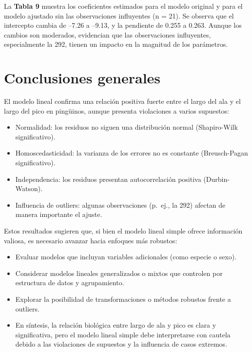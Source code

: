\documentclass[
  spanish,
  11pt,
  a4paper,
  DIV=11,
  numbers=noendperiod]{scrartcl}
\begin{document}
La \textbf{Tabla 9} muestra los coeficientes estimados para el modelo
original y para el modelo ajustado sin las observaciones influyentes (n
= 21). Se observa que el intercepto cambia de --7.26 a --9.13, y la
pendiente de 0.255 a 0.263. Aunque los cambios son moderados, evidencian
que las observaciones influyentes, especialmente la 292, tienen un
impacto en la magnitud de los parámetros.

\section{Conclusiones generales}\label{conclusiones-generales}

El modelo lineal confirma una relación positiva fuerte entre el largo
del ala y el largo del pico en pingüinos, aunque presenta violaciones a
varios supuestos:

\begin{itemize}
\item
  Normalidad: los residuos no siguen una distribución normal
  (Shapiro-Wilk significativo).
\item
  Homoscedasticidad: la varianza de los errores no es constante
  (Breusch-Pagan significativo).
\item
  Independencia: los residuos presentan autocorrelación positiva
  (Durbin-Watson).
\item
  Influencia de outliers: algunas observaciones (p.~ej., la 292) afectan
  de manera importante el ajuste.
\end{itemize}

Estos resultados sugieren que, si bien el modelo lineal simple ofrece
información valiosa, es necesario avanzar hacia enfoques más robustos:

\begin{itemize}
\item
  Evaluar modelos que incluyan variables adicionales (como especie o
  sexo).
\item
  Considerar modelos lineales generalizados o mixtos que controlen por
  estructura de datos y agrupamiento.
\item
  Explorar la posibilidad de transformaciones o métodos robustos frente
  a outliers.
\item
  En síntesis, la relación biológica entre largo de ala y pico es clara
  y significativa, pero el modelo lineal simple debe interpretarse con
  cautela debido a las violaciones de supuestos y la influencia de casos
  extremos.
\end{itemize}
\end{document}
